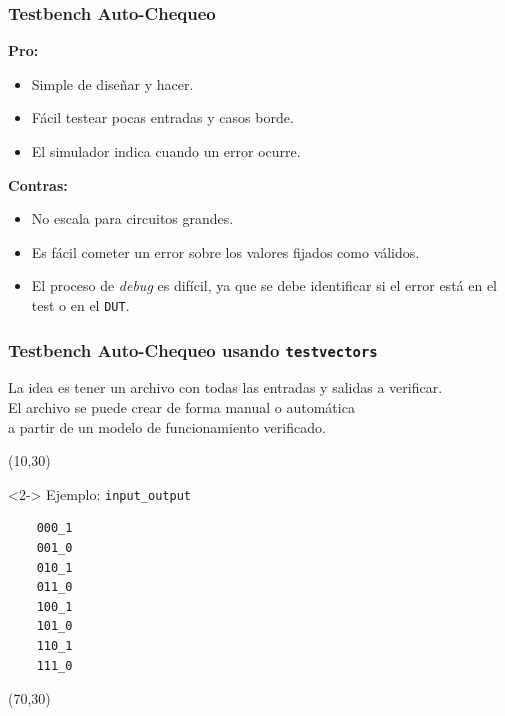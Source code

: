\documentclass[aspectratio=169]{beamer}
\begin{document}
\begin{frame}[fragile,t]
    \frametitle{Testbench Auto-Chequeo}
    \textcolor{v}{\textbf{Pro:}}\\
    \begin{itemize}
    \item Simple de diseñar y hacer.
    \item Fácil testear pocas entradas y casos borde.
    \item El simulador indica cuando un error ocurre.
    \end{itemize}
    \pause
    \textcolor{r}{\textbf{Contras:}}\\
    \begin{itemize}
    \item No escala para circuitos grandes.
    \item Es fácil cometer un error sobre los valores fijados como válidos.
    \item El proceso de \emph{debug} es difícil, ya que se debe identificar si el error está en el test o en el \texttt{DUT}.
    \end{itemize}
\end{frame}
  
\begin{frame}[fragile,t]
    \frametitle{Testbench Auto-Chequeo usando \texttt{testvectors}}
    La idea es tener un archivo con todas las entradas y salidas a verificar.\\
    \textcolor{verdeuca}{El archivo se puede crear de forma manual o automática\\ a partir de un modelo de funcionamiento verificado.}
    \begin{textblock}{45}(10,30)
    \begin{onlyenv}<2->
    Ejemplo: \texttt{input\_output}
\begin{lstlisting}  
    000_1
    001_0
    010_1
    011_0
    100_1
    101_0
    110_1
    111_0
\end{lstlisting}
    \end{onlyenv}
    \end{textblock}
    \begin{textblock}{75}(70,30)
    \small
    \end{textblock}
\end{frame}
\end{document}
